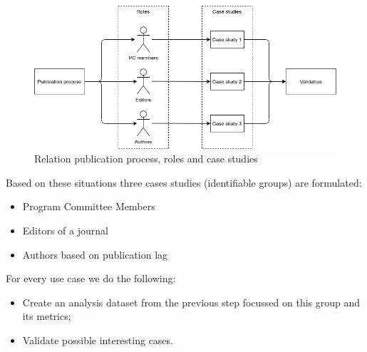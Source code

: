 \documentclass{ou-report}
\begin{document}
\begin{figure}[H]
\centering
\includegraphics[width=13cm]{images/research_method/research_method.png}
\caption{Relation publication process, roles and case studies}
\label{fig:research_method}
\end{figure}
Based on these situations three cases studies (identifiable groups) are formulated:
\begin{itemize}
    \item Program Committee Members
    \item Editors of a journal
    \item Authors based on publication lag
\end{itemize}

For every use case we do the following:
\begin{itemize}
    \item Create an analysis dataset from the previous step focussed on
    this group and its metrics;
    \item Validate possible interesting cases.
\end{itemize}


\end{document}
